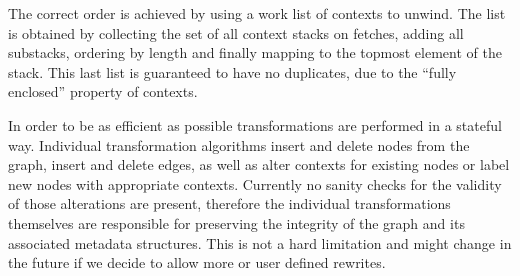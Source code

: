 The correct order is achieved by using a work list of contexts to unwind.
The list is obtained by collecting the set of all context stacks on fetches, adding all substacks, ordering by length and finally mapping to the topmost element of the stack.
This last list is guaranteed to have no duplicates, due to the ``fully enclosed'' property of contexts.

In order to be as efficient as possible transformations are performed in a stateful way.
Individual transformation algorithms insert and delete nodes from the graph, insert and delete edges, as well as alter contexts for existing nodes or label new nodes with appropriate contexts.
Currently no sanity checks for the validity of those alterations are present, therefore the individual transformations themselves are responsible for preserving the integrity of the graph and its associated metadata structures.
This is not a hard limitation and might change in the future if we decide to allow more or user defined rewrites.
